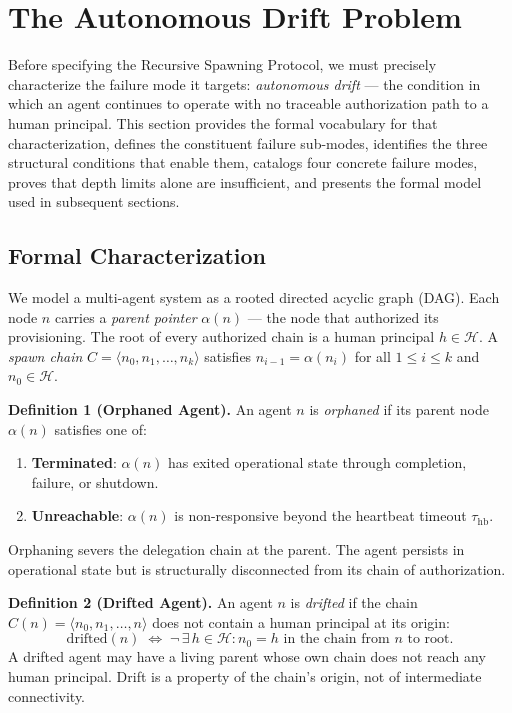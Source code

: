 \section{The Autonomous Drift Problem}
\label{sec:drift}

Before specifying the Recursive Spawning Protocol, we must precisely characterize the failure mode it targets: \emph{autonomous drift} — the condition in which an agent continues to operate with no traceable authorization path to a human principal. This section provides the formal vocabulary for that characterization, defines the constituent failure sub-modes, identifies the three structural conditions that enable them, catalogs four concrete failure modes, proves that depth limits alone are insufficient, and presents the formal model used in subsequent sections.

\subsection{Formal Characterization}
\label{sec:drift-formal}

We model a multi-agent system as a rooted directed acyclic graph (DAG). Each node $n$ carries a \emph{parent pointer} $\alpha(n)$ — the node that authorized its provisioning. The root of every authorized chain is a human principal $h \in \mathcal{H}$. A \emph{spawn chain} $C = \langle n_0, n_1, \ldots, n_k \rangle$ satisfies $n_{i-1} = \alpha(n_i)$ for all $1 \leq i \leq k$ and $n_0 \in \mathcal{H}$.

\medskip
\noindent\textbf{Definition 1 (Orphaned Agent).}
An agent $n$ is \emph{orphaned} if its parent node $\alpha(n)$ satisfies one of:
\begin{enumerate}
  \item[(a)] \textbf{Terminated}: $\alpha(n)$ has exited operational state through completion, failure, or shutdown.
  \item[(b)] \textbf{Unreachable}: $\alpha(n)$ is non-responsive beyond the heartbeat timeout $\tau_{\mathrm{hb}}$.
\end{enumerate}
Orphaning severs the delegation chain at the parent. The agent persists in operational state but is structurally disconnected from its chain of authorization.

\medskip
\noindent\textbf{Definition 2 (Drifted Agent).}
An agent $n$ is \emph{drifted} if the chain $C(n) = \langle n_0, n_1, \ldots, n \rangle$ does not contain a human principal at its origin:
\begin{equation}
\mathrm{drifted}(n) \;\iff\; \neg\,\exists\, h \in \mathcal{H} : n_0 = h \text{ in the chain from } n \text{ to root}.
\label{eq:drifted-def}
\end{equation}
A drifted agent may have a living parent whose own chain does not reach any human principal. Drift is a property of the chain's origin, not of intermediate connectivity.

